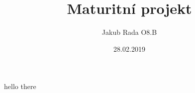 \documentclass[9pt]{beamer}
\title{Maturitní projekt}
\author{Jakub Rada O8.B}
\institute{Gymnázium Nad Alejí}
\date{28.02.2019}
\begin{document}
    \frame{\titlepage}
    \begin{frame}
        hello there
    \end{frame}
\end{document}
